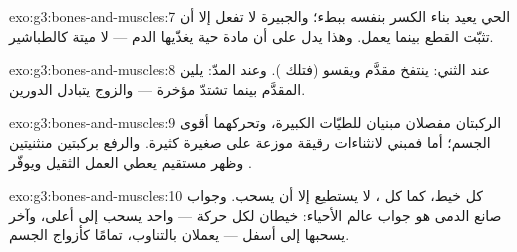 \begin{solution}{exo:g3:bones-and-muscles:7}
 الحي يعيد بناء الكسر بنفسه ببطء؛ والجبيرة لا تفعل إلا أن
تثبّت القطع بينما يعمل. وهذا يدل على أن  مادة حية يغذّيها
الدم --- لا ميتة كالطباشير.
\end{solution}

\begin{solution}{exo:g3:bones-and-muscles:8}
عند الثني: ينتفخ مقدَّم  ويقسو (فتلك  ). وعند
المدّ: يلين المقدَّم بينما تشتدّ مؤخرة  --- والزوج يتبادل
الدورين.
\end{solution}

\begin{solution}{exo:g3:bones-and-muscles:9}
الركبتان مفصلان مبنيان للطيّات الكبيرة، وتحركهما أقوى  الجسم؛
أما  فمبني لانثناءات رقيقة موزعة على  صغيرة
كثيرة. والرفع بركبتين منثنيتين وظهر مستقيم يعطي العمل الثقيل
 ويوفّر .
\end{solution}

\begin{solution}{exo:g3:bones-and-muscles:10}
كل خيط، كما كل ، لا يستطيع إلا أن يسحب. وجواب صانع الدمى هو
جواب عالم الأحياء: خيطان لكل حركة --- واحد يسحب  إلى أعلى،
وآخر يسحبها إلى أسفل --- يعملان بالتناوب، تمامًا كأزواج 
الجسم.
\end{solution}
